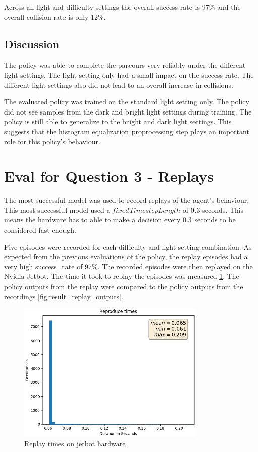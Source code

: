 Across all light and difficulty settings the overall success rate is 97\% and the overall collision rate is only 12\%.

\subsection{Discussion}

The policy was able to complete the parcours very reliably under the different light settings. The light setting only had a small impact on the success rate.
The different light settings also did not lead to an overall increase in collisions.

The evaluated policy was trained on the standard light setting only. The policy did not see samples from the dark and bright light settings during training. The policy is still able to generalize to the bright and dark light settings.
This suggests that the histogram equalization proprocessing step plays an important role for this policy's behaviour.


\section{Eval for Question 3 - Replays}

The most successful model was used to record replays of the agent's behaviour. This most successful model used a $fixedTimestepLength$ of $0.3$ seconds. This means the hardware has to able to make a decision every $0.3$ seconds to be considered fast enough.

Five episodes were recorded for each difficulty and light setting combination. As expected from the previous evaluations of the policy, the replay episodes had a very high success\_rate of 97\%. The recorded episodes were then replayed on the Nvidia Jetbot. The time it took to replay the episodes was measured \ref{fig:result_replay_times}. The policy outputs from the replay were compared to the policy outputs from the recordings \ref{fig:result_replay_outputs}.


\begin{figure}
    \centering
    \includegraphics[width=0.8\textwidth]{Bilder/notebook_images/replay_times.png}
    \caption{Replay times on jetbot hardware}
    \label{fig:result_replay_times}
\end{figure} %


